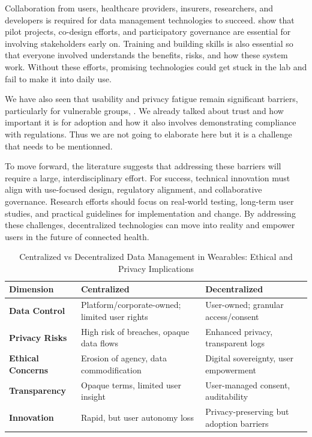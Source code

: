 	Collaboration from users, healthcare providers, insurers, researchers, and developers is required for data management technologies to succeed. \cite{Mun2010} show that pilot projects, co-design efforts, and participatory governance are essential for involving stakeholders early on. Training and building skills is also essential so that everyone involved understands the benefits, risks, and how these system work. Without these efforts, promising technologies could get stuck in the lab and fail to make it into daily use.

	We have also seen that usability and privacy fatigue remain significant barriers, particularly for vulnerable groups, \cite{Choi2018}. We already talked about trust and how important it is for adoption and how it also involves demonstrating compliance with regulations.
	Thus we are not going to elaborate here but it is a challenge that needs to be mentionned.

	To move forward, the literature suggests that addressing these barriers will require a large, interdisciplinary effort. For success, technical innovation must align with use-focused design, regulatory alignment, and collaborative governance. Research efforts should focus on real-world testing, long-term user studies, and practical guidelines for implementation and change. By addressing these challenges, decentralized technologies can move into reality and empower users in the future of connected health.

	\begin{table}[hbt]
		\caption{Centralized vs Decentralized Data Management in Wearables: Ethical and Privacy Implications}
		\centering
		\begin{tabular}{p{3.5cm} p{6.5cm} p{6.5cm}}
			\toprule
			\textbf{Dimension} & \textbf{Centralized} & \textbf{Decentralized} \\
			\midrule
			\textbf{Data Control} & Platform/corporate-owned; limited user rights & User-owned; granular access/consent \\
			\addlinespace
			\textbf{Privacy Risks} & High risk of breaches, opaque data flows & Enhanced privacy, transparent logs \\
			\addlinespace
			\textbf{Ethical Concerns} & Erosion of agency, data commodification & Digital sovereignty, user empowerment \\
			\addlinespace
			\textbf{Transparency} & Opaque terms, limited user insight & User-managed consent, auditability \\
			\addlinespace
			\textbf{Innovation} & Rapid, but user autonomy loss & Privacy-preserving but adoption barriers \\
			\bottomrule
		\end{tabular}
		\label{tab:centralized_vs_decentralized_brief}
	\end{table}

